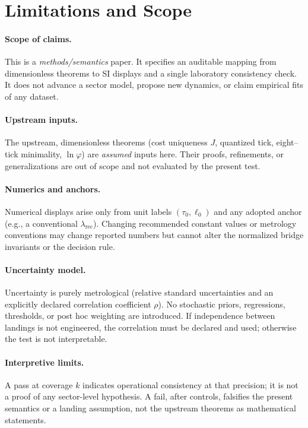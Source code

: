 \documentclass[11pt]{article}
\theoremstyle{plain}
\theoremstyle{definition}
\theoremstyle{remark}
\begin{document}
\section{Limitations and Scope}

\paragraph{Scope of claims.}
This is a \emph{methods/semantics} paper. It specifies an auditable mapping from dimensionless theorems to SI displays and a single laboratory consistency check. It does not advance a sector model, propose new dynamics, or claim empirical fits of any dataset.

\paragraph{Upstream inputs.}
The upstream, dimensionless theorems (cost uniqueness \(J\), quantized tick, eight–tick minimality, \(\ln\varphi\)) are \emph{assumed} inputs here. Their proofs, refinements, or generalizations are out of scope and not evaluated by the present test.

\paragraph{Numerics and anchors.}
Numerical displays arise only from unit labels \((\tau_{0},\ell_{0})\) and any adopted anchor (e.g., a conventional \(\lambda_{\mathrm{rec}}\)). Changing recommended constant values or metrology conventions may change reported numbers but cannot alter the normalized bridge invariants or the decision rule.

\paragraph{Uncertainty model.}
Uncertainty is purely metrological (relative standard uncertainties and an explicitly declared correlation coefficient \(\rho\)). No stochastic priors, regressions, thresholds, or post hoc weighting are introduced. If independence between landings is not engineered, the correlation must be declared and used; otherwise the test is not interpretable.

\paragraph{Interpretive limits.}
A pass at coverage \(k\) indicates operational consistency at that precision; it is not a proof of any sector-level hypothesis. A fail, after controls, falsifies the present semantics or a landing assumption, not the upstream theorems as mathematical statements.
\end{document}
